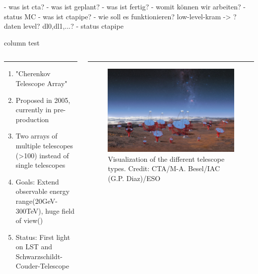 \begin{frame}
    - was ist cta?
    - was ist geplant?
    - was ist fertig?
    - womit können wir arbeiten?
    - status MC
    - was ist ctapipe?
    - wie soll es funktionieren? low-level-kram -> ? daten level? dl0,dl1,...?
    - status ctapipe
\end{frame}

\begin{frame}{column test}
    \begin{columns}[T] %
        \begin{column}{.48\textwidth}
            \color{red}\rule{\linewidth}{4pt}
            \begin{enumerate}
                \item "Cherenkov Telescope Array"
                \item Proposed in 2005, currently in pre-production
                \item Two arrays of multiple telescopes (>100) instead of single telescopes
                \item Goals: Extend observable energy range(20GeV-300TeV), huge field of view()
                \item Status: First light on LST and Schwarzschildt-Couder-Telescope
            \end{enumerate}
        \end{column}%
        \hfill%
        \begin{column}{.48\textwidth}
            \color{blue}\rule{\linewidth}{4pt}
            \begin{figure}
                \includegraphics[width=\linewidth]{images/cta_telescopes.jpg}
                \caption{Visualization of the different telescope types. Credit: CTA/M-A. Besel/IAC (G.P. Diaz)/ESO}
            \end{figure}
        \end{column}%
    \end{columns}
\end{frame}


